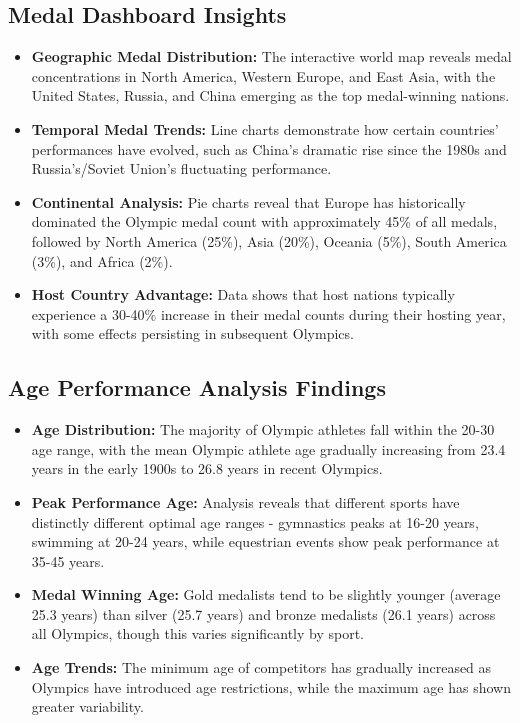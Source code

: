 \documentclass[a4paper, 12pt]{article}
\begin{document}
\subsection{Medal Dashboard Insights}
\begin{itemize}[leftmargin=*]
    \item \textbf{Geographic Medal Distribution:} The interactive world map reveals medal concentrations in North America, Western Europe, and East Asia, with the United States, Russia, and China emerging as the top medal-winning nations.
    
    \item \textbf{Temporal Medal Trends:} Line charts demonstrate how certain countries' performances have evolved, such as China's dramatic rise since the 1980s and Russia's/Soviet Union's fluctuating performance.
    
    \item \textbf{Continental Analysis:} Pie charts reveal that Europe has historically dominated the Olympic medal count with approximately 45\% of all medals, followed by North America (25\%), Asia (20\%), Oceania (5\%), South America (3\%), and Africa (2\%).
    
    \item \textbf{Host Country Advantage:} Data shows that host nations typically experience a 30-40\% increase in their medal counts during their hosting year, with some effects persisting in subsequent Olympics.
\end{itemize}

\subsection{Age Performance Analysis Findings}
\begin{itemize}[leftmargin=*]
    \item \textbf{Age Distribution:} The majority of Olympic athletes fall within the 20-30 age range, with the mean Olympic athlete age gradually increasing from 23.4 years in the early 1900s to 26.8 years in recent Olympics.
    
    \item \textbf{Peak Performance Age:} Analysis reveals that different sports have distinctly different optimal age ranges - gymnastics peaks at 16-20 years, swimming at 20-24 years, while equestrian events show peak performance at 35-45 years.
    
    \item \textbf{Medal Winning Age:} Gold medalists tend to be slightly younger (average 25.3 years) than silver (25.7 years) and bronze medalists (26.1 years) across all Olympics, though this varies significantly by sport.
    
    \item \textbf{Age Trends:} The minimum age of competitors has gradually increased as Olympics have introduced age restrictions, while the maximum age has shown greater variability.
\end{itemize}
\end{document}
